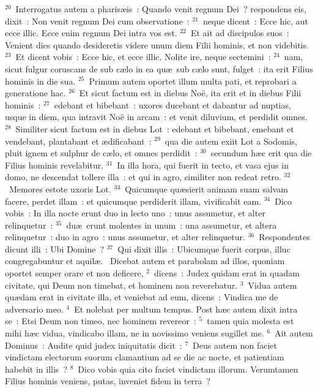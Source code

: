${}^{20}$~Interrogatus autem a pharis\ae is~: Quando venit regnum Dei~? respondens eis, dixit~: Non venit regnum Dei cum observatione~:
${}^{21}$~neque dicent~: Ecce hic, aut ecce illic. Ecce enim regnum Dei intra vos est.
${}^{22}$~Et ait ad discipulos suos~: Venient dies quando desideretis videre unum diem Filii hominis, et non videbitis.
${}^{23}$~Et dicent vobis~: Ecce hic, et ecce illic. Nolite ire, neque sectemini~:
${}^{24}$~nam, sicut fulgur coruscans de sub c\ae lo in ea qu\ae\ sub c\ae lo sunt, fulget~: ita erit Filius hominis in die sua.
${}^{25}$~Primum autem oportet illum multa pati, et reprobari a generatione hac.
${}^{26}$~Et sicut factum est in diebus No\"e, ita erit et in diebus Filii hominis~:
${}^{27}$~edebant et bibebant~: uxores ducebant et dabantur ad nuptias, usque in diem, qua intravit No\"e in arcam~: et venit diluvium, et perdidit omnes.
${}^{28}$~Similiter sicut factum est in diebus Lot~: edebant et bibebant, emebant et vendebant, plantabant et \ae dificabant~:
${}^{29}$~qua die autem exiit Lot a Sodomis, pluit ignem et sulphur de c\ae lo, et omnes perdidit~:
${}^{30}$~secundum h\ae c erit qua die Filius hominis revelabitur.
${}^{31}$~In illa hora, qui fuerit in tecto, et vasa ejus in domo, ne descendat tollere illa~: et qui in agro, similiter non redeat retro.
${}^{32}$~Memores estote uxoris Lot.
${}^{33}$~Quicumque qu\ae sierit animam suam salvam facere, perdet illam~: et quicumque perdiderit illam, vivificabit eam.
${}^{34}$~Dico vobis~: In illa nocte erunt duo in lecto uno~: unus assumetur, et alter relinquetur~:
${}^{35}$~du\ae\ erunt molentes in unum~: una assumetur, et altera relinquetur~: duo in agro~: unus assumetur, et alter relinquetur.
${}^{36}$~Respondentes dicunt illi~: Ubi Domine~?
${}^{37}$~Qui dixit illis~: Ubicumque fuerit corpus, illuc congregabuntur et aquil\ae .
~Dicebat autem et parabolam ad illos, quoniam oportet semper orare et non deficere,
${}^{2}$~dicens~: Judex quidam erat in quadam civitate, qui Deum non timebat, et hominem non reverebatur.
${}^{3}$~Vidua autem qu\ae dam erat in civitate illa, et veniebat ad eum, dicens~: Vindica me de adversario meo.
${}^{4}$~Et nolebat per multum tempus. Post h\ae c autem dixit intra se~: Etsi Deum non timeo, nec hominem revereor~:
${}^{5}$~tamen quia molesta est mihi h\ae c vidua, vindicabo illam, ne in novissimo veniens sugillet me.
${}^{6}$~Ait autem Dominus~: Audite quid judex iniquitatis dicit~:
${}^{7}$~Deus autem non faciet vindictam electorum suorum clamantium ad se die ac nocte, et patientiam habebit in illis~?
${}^{8}$~Dico vobis quia cito faciet vindictam illorum. Verumtamen Filius hominis veniens, putas, inveniet fidem in terra~?


